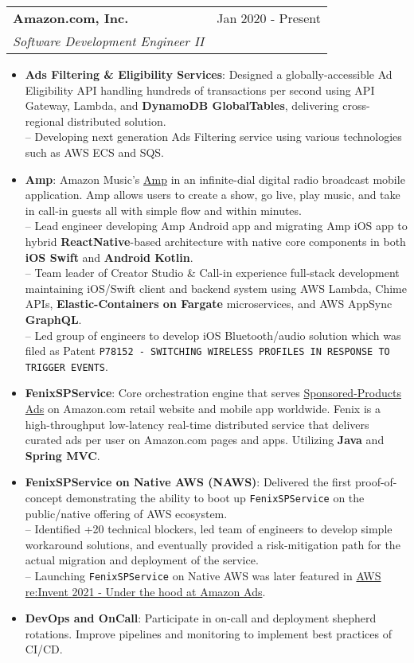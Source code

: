 \documentclass[letterpaper,11pt]{article}
\makeatletter
\newcommand{\resumeItem}[2]{
  \item\small{
    \textbf{#1}{: #2 \vspace{-2pt}}
  }
}
\newcommand{\resumeSubheading}[4]{
  \vspace{-1pt}\item
    \begin{tabular*}{0.97\textwidth}[t]{l@{\extracolsep{\fill}}r}
      \textbf{#1} & #2 \\
      \textit{\small #3} & \textit{\small #4} \\
    \end{tabular*}\vspace{-5pt}
}
\newcommand{\resumeItemListStart}{\begin{itemize}}
\newcommand{\resumeItemListEnd}{\end{itemize}\vspace{-5pt}}
\makeatother
\begin{document}
    \resumeSubheading
      {Amazon.com, Inc.}{Jan 2020 - Present}
      {Software Development Engineer II}{}
      \resumeItemListStart
		\resumeItem{Ads Filtering \& Eligibility Services}
          {Designed a globally-accessible Ad Eligibility API handling hundreds of transactions per second using API Gateway, Lambda, and \textbf{DynamoDB GlobalTables}, delivering cross-regional distributed solution. \\
          -- Developing next generation Ads Filtering service using various technologies such as AWS ECS and SQS.}
		\resumeItem{Amp}
          {Amazon Music's \href{https://techcrunch.com/2022/03/08/amazon-launches-a-live-radio-app-amp-which-lets-you-play-dj-with-the-amazon-music-catalog/}{Amp} in an infinite-dial digital radio broadcast mobile application. Amp allows users to create a show, go live, play music, and take in call-in guests all with simple flow and within minutes.\\
          -- Lead engineer developing Amp Android app and migrating Amp iOS app to hybrid \textbf{ReactNative}-based architecture with native core components in both \textbf{iOS Swift} and \textbf{Android Kotlin}.\\
          -- Team leader of Creator Studio \& Call-in experience full-stack development maintaining iOS/Swift client and backend system using AWS Lambda, Chime APIs, \textbf{Elastic-Containers on Fargate} microservices, and AWS AppSync \textbf{GraphQL}.\\
          -- Led group of engineers to develop iOS Bluetooth/audio solution which was filed as Patent \texttt{P78152 - SWITCHING WIRELESS PROFILES IN RESPONSE TO TRIGGER EVENTS}.}          
		\resumeItem{FenixSPService}
          {Core orchestration engine that serves \href{https://advertising.amazon.com/solutions/products/sponsored-products}{Sponsored-Products Ads} on Amazon.com retail website and mobile app worldwide. Fenix is a high-throughput low-latency real-time distributed service that delivers curated ads per user on Amazon.com pages and apps. Utilizing \textbf{Java} and \textbf{Spring MVC}.}
        \resumeItem{FenixSPService on Native AWS (NAWS)}
          {Delivered the first proof-of-concept demonstrating the ability to boot up \texttt{FenixSPService} on the public/native offering of AWS ecosystem.\\
          -- Identified +20 technical blockers, led team of engineers to develop simple workaround solutions, and eventually provided a risk-mitigation path for the actual migration and deployment of the service.\\
          -- Launching \texttt{FenixSPService} on Native AWS was later featured in \href{https://youtu.be/BS4MPpEO66I?t=1067}{AWS re:Invent 2021 - Under the hood at Amazon Ads}.}
        \resumeItem{DevOps and OnCall}
          {Participate in on-call and deployment shepherd rotations. Improve pipelines and monitoring to implement best practices of CI/CD.}
	\resumeItemListEnd
\end{document}
